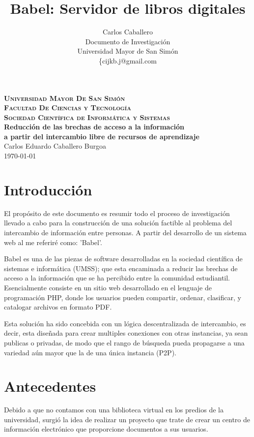 \documentclass[letter,11pt,oneside,spanish]{article}
\title{\textbf{Babel: Servidor de libros digitales}}
\author{Carlos Caballero\\
Documento de Investigación\\
Universidad Mayor de San Simón\\
\{cijkb.j@gmail.com\\}
\date{}
\begin{document}
\begin{titlepage}
\thispagestyle{empty}
\begin{center}
\large{\textsc{\bf Universidad Mayor De San Simón}}\\
\large{\textsc{\bf Facultad De Ciencias y Tecnología}}\\
\large{\textsc{\bf Sociedad Científica de Informática y Sistemas}}\\
\vspace{4.0cm}
\large{\bf Reducción de las brechas de acceso a la información\\
a partir del intercambio libre de recursos de aprendizaje}\\
\vspace{1.0cm}
\small{Carlos Eduardo Caballero Burgoa}
~\\
\small{\today}
\end{center}
\end{titlepage}

\newpage
\tableofcontents

\newpage
\section{Introducción}
El propósito de este documento es resumir todo el proceso de investigación
llevado a cabo para la construcción de una solución factible al problema del
intercambio de información entre personas. A partir del desarrollo de un sistema
web al me referiré como: 'Babel'.

Babel es una de las piezas de software desarrolladas en la sociedad científica
de sistemas e informática (UMSS); que esta encaminada a reducir las brechas de
acceso a la información que se ha percibido entre la comunidad estudiantil.
Esencialmente consiste en un sitio web desarrollado en el lenguaje de
programación PHP, donde los usuarios pueden compartir, ordenar, clasificar, y
catalogar archivos en formato PDF.

Esta solución ha sido concebida con un lógica descentralizada de intercambio, es
decir, esta diseñada para crear multiples conexiones con otras instancias, ya
sean publicas o privadas, de modo que el rango de búsqueda pueda propagarse a
una variedad aún mayor que la de una única instancia (P2P).

\section{Antecedentes}
Debido a que no contamos con una biblioteca virtual en los predios de la
universidad, surgió la idea de realizar un proyecto que trate de crear un centro
de información electrónico que proporcione documentos a sus usuarios.
\end{document}
